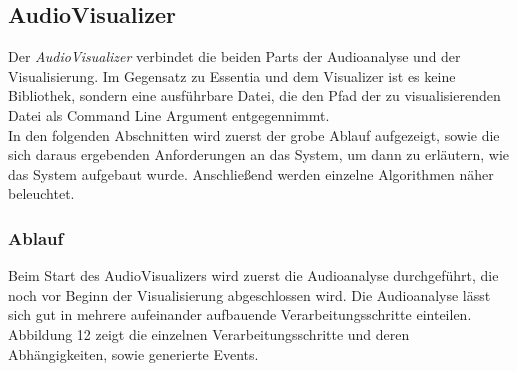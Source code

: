 \documentclass[11pt,a4paper]{article}
\begin{document}
\subsection{AudioVisualizer}
Der \textit{AudioVisualizer} verbindet die beiden Parts der Audioanalyse und der Visualisierung. Im Gegensatz zu Essentia und dem Visualizer ist es keine Bibliothek, sondern eine ausführbare Datei, die den Pfad der zu visualisierenden Datei als Command Line Argument entgegennimmt.\\
In den folgenden Abschnitten wird zuerst der grobe Ablauf aufgezeigt, sowie die sich daraus ergebenden Anforderungen an das System, um dann zu erläutern, wie das System aufgebaut wurde. Anschließend werden einzelne Algorithmen näher beleuchtet.

\subsubsection{Ablauf}
Beim Start des AudioVisualizers wird zuerst die Audioanalyse durchgeführt, die noch vor Beginn der Visualisierung abgeschlossen wird. Die Audioanalyse lässt sich gut in mehrere aufeinander aufbauende Verarbeitungsschritte einteilen. Abbildung 12 zeigt die einzelnen Verarbeitungsschritte und deren Abhängigkeiten, sowie generierte Events.
\end{document}
